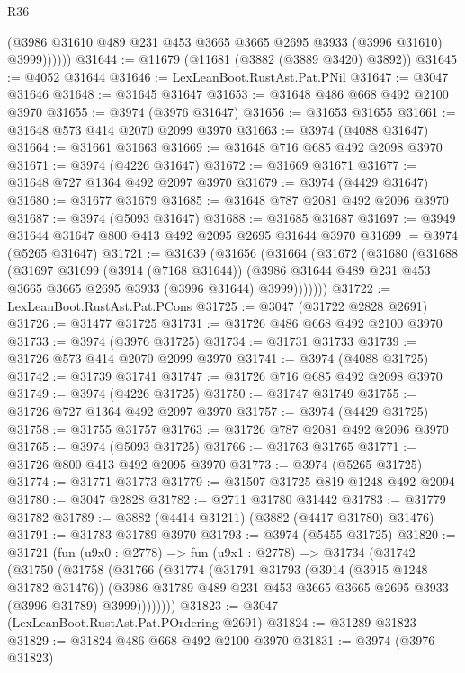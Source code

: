\begin{lexlean}{R36}
\begin{coremodule}
              (@3986 @31610 @489 @231 @453 @3665 @3665 @2695 @3933 (@3996 @31610) @3999))))))
@31644 := @11679 (@11681 (@3882 (@3889 @3420) @3892))
@31645 := @4052 @31644
@31646 := LexLeanBoot.RustAst.Pat.PNil
@31647 := @3047 @31646
@31648 := @31645 @31647
@31653 := @31648 @486 @668 @492 @2100 @3970
@31655 := @3974 (@3976 @31647)
@31656 := @31653 @31655
@31661 := @31648 @573 @414 @2070 @2099 @3970
@31663 := @3974 (@4088 @31647)
@31664 := @31661 @31663
@31669 := @31648 @716 @685 @492 @2098 @3970
@31671 := @3974 (@4226 @31647)
@31672 := @31669 @31671
@31677 := @31648 @727 @1364 @492 @2097 @3970
@31679 := @3974 (@4429 @31647)
@31680 := @31677 @31679
@31685 := @31648 @787 @2081 @492 @2096 @3970
@31687 := @3974 (@5093 @31647)
@31688 := @31685 @31687
@31697 := @3949 @31644 @31647 @800 @413 @492 @2095 @2695 @31644 @3970
@31699 := @3974 (@5265 @31647)
@31721 := @31639
    (@31656
      (@31664
        (@31672
          (@31680
            (@31688
              (@31697
                @31699
                (@3914 (@7168 @31644))
                (@3986 @31644 @489 @231 @453 @3665 @3665 @2695 @3933 (@3996 @31644) @3999)))))))
@31722 := LexLeanBoot.RustAst.Pat.PCons
@31725 := @3047 (@31722 @2828 @2691)
@31726 := @31477 @31725
@31731 := @31726 @486 @668 @492 @2100 @3970
@31733 := @3974 (@3976 @31725)
@31734 := @31731 @31733
@31739 := @31726 @573 @414 @2070 @2099 @3970
@31741 := @3974 (@4088 @31725)
@31742 := @31739 @31741
@31747 := @31726 @716 @685 @492 @2098 @3970
@31749 := @3974 (@4226 @31725)
@31750 := @31747 @31749
@31755 := @31726 @727 @1364 @492 @2097 @3970
@31757 := @3974 (@4429 @31725)
@31758 := @31755 @31757
@31763 := @31726 @787 @2081 @492 @2096 @3970
@31765 := @3974 (@5093 @31725)
@31766 := @31763 @31765
@31771 := @31726 @800 @413 @492 @2095 @3970
@31773 := @3974 (@5265 @31725)
@31774 := @31771 @31773
@31779 := @31507 @31725 @819 @1248 @492 @2094
@31780 := @3047 @2828
@31782 := @2711 @31780 @31442
@31783 := @31779 @31782
@31789 := @3882 (@4414 @31211) (@3882 (@4417 @31780) @31476)
@31791 := @31783 @31789 @3970
@31793 := @3974 (@5455 @31725)
@31820 := @31721
    (fun (u9x0 : @2778) =>
    fun (u9x1 : @2778) =>
    @31734
      (@31742
        (@31750
          (@31758
            (@31766
              (@31774
                (@31791
                  @31793
                  (@3914 (@3915 @1248 @31782 @31476))
                  (@3986 @31789 @489 @231 @453 @3665 @3665 @2695 @3933 (@3996 @31789) @3999))))))))
@31823 := @3047 (LexLeanBoot.RustAst.Pat.POrdering @2691)
@31824 := @31289 @31823
@31829 := @31824 @486 @668 @492 @2100 @3970
@31831 := @3974 (@3976 @31823)

\end{coremodule}
\end{lexlean}
